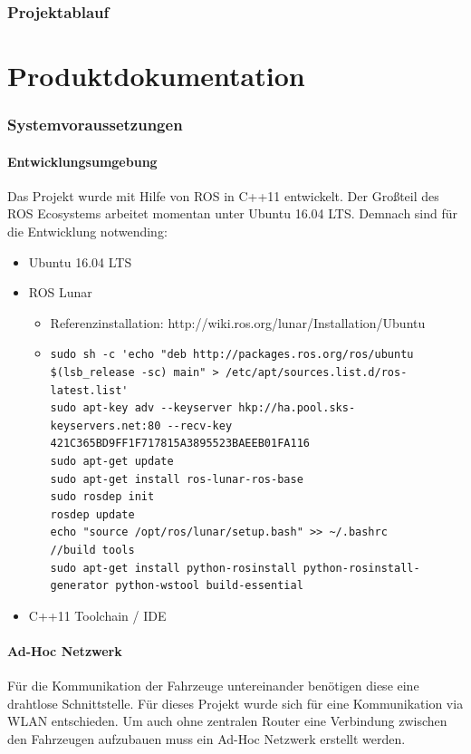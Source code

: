 \documentclass[a4paper, 12pt, titlepage]{scrartcl}
\begin{document}

	\section{Projektablauf}
	\label{projektablauf}
\newpage
\part{Produktdokumentation}
	\section{Systemvoraussetzungen}
	\label{systemvoraussetzungen}
	\subsection{Entwicklungsumgebung}
	Das Projekt wurde mit Hilfe von ROS in C++11 entwickelt. Der Großteil des ROS Ecosystems arbeitet momentan unter Ubuntu 16.04 LTS. Demnach sind für die Entwicklung notwending:
	\begin{itemize}
		\item Ubuntu 16.04 LTS
		\item ROS Lunar
		\begin{itemize}
			\item Referenzinstallation: http://wiki.ros.org/lunar/Installation/Ubuntu
			\item[] \begin{lstlisting}
sudo sh -c 'echo "deb http://packages.ros.org/ros/ubuntu $(lsb_release -sc) main" > /etc/apt/sources.list.d/ros-latest.list'
sudo apt-key adv --keyserver hkp://ha.pool.sks-keyservers.net:80 --recv-key 421C365BD9FF1F717815A3895523BAEEB01FA116
sudo apt-get update
sudo apt-get install ros-lunar-ros-base
sudo rosdep init
rosdep update
echo "source /opt/ros/lunar/setup.bash" >> ~/.bashrc
//build tools
sudo apt-get install python-rosinstall python-rosinstall-generator python-wstool build-essential
		\end{lstlisting}
		\end{itemize}
		\item C++11 Toolchain / IDE
	\end{itemize}
	\subsection{Ad-Hoc Netzwerk}
	Für die Kommunikation der Fahrzeuge untereinander benötigen diese eine drahtlose Schnittstelle. Für dieses 
	Projekt wurde sich für eine Kommunikation via WLAN entschieden. Um auch ohne zentralen Router eine Verbindung 
	zwischen den Fahrzeugen aufzubauen muss ein Ad-Hoc Netzwerk erstellt werden.
\end{document}
